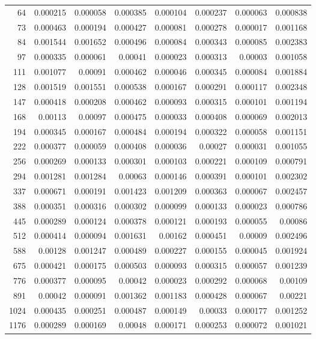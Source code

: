 \begin{longtable}{r r r r r r r r}
64 & 0.000215 & 0.000058 & 0.000385 & 0.000104 & 0.000237 & 0.000063 & 0.000838 \\
73 & 0.000463 & 0.000194 & 0.000427 & 0.000081 & 0.000278 & 0.000017 & 0.001168 \\
84 & 0.001544 & 0.001652 & 0.000496 & 0.000084 & 0.000343 & 0.000085 & 0.002383 \\
97 & 0.000335 & 0.000061 & 0.00041 & 0.000023 & 0.000313 & 0.00003 & 0.001058 \\
111 & 0.001077 & 0.00091 & 0.000462 & 0.000046 & 0.000345 & 0.000084 & 0.001884 \\
128 & 0.001519 & 0.001551 & 0.000538 & 0.000167 & 0.000291 & 0.000117 & 0.002348 \\
147 & 0.000418 & 0.000208 & 0.000462 & 0.000093 & 0.000315 & 0.000101 & 0.001194 \\
168 & 0.00113 & 0.00097 & 0.000475 & 0.000033 & 0.000408 & 0.000069 & 0.002013 \\
194 & 0.000345 & 0.000167 & 0.000484 & 0.000194 & 0.000322 & 0.000058 & 0.001151 \\
222 & 0.000377 & 0.000059 & 0.000408 & 0.000036 & 0.00027 & 0.000031 & 0.001055 \\
256 & 0.000269 & 0.000133 & 0.000301 & 0.000103 & 0.000221 & 0.000109 & 0.000791 \\
294 & 0.001281 & 0.001284 & 0.00063 & 0.000146 & 0.000391 & 0.000101 & 0.002302 \\
337 & 0.000671 & 0.000191 & 0.001423 & 0.001209 & 0.000363 & 0.000067 & 0.002457 \\
388 & 0.000351 & 0.000316 & 0.000302 & 0.000099 & 0.000133 & 0.000023 & 0.000786 \\
445 & 0.000289 & 0.000124 & 0.000378 & 0.000121 & 0.000193 & 0.000055 & 0.00086 \\
512 & 0.000414 & 0.000094 & 0.001631 & 0.00162 & 0.000451 & 0.00009 & 0.002496 \\
588 & 0.00128 & 0.001247 & 0.000489 & 0.000227 & 0.000155 & 0.000045 & 0.001924 \\
675 & 0.000421 & 0.000175 & 0.000503 & 0.000093 & 0.000315 & 0.000057 & 0.001239 \\
776 & 0.000377 & 0.000095 & 0.00042 & 0.000023 & 0.000292 & 0.000068 & 0.00109 \\
891 & 0.00042 & 0.000091 & 0.001362 & 0.001183 & 0.000428 & 0.000067 & 0.00221 \\
1024 & 0.000435 & 0.000251 & 0.000487 & 0.000149 & 0.00033 & 0.000177 & 0.001252 \\
1176 & 0.000289 & 0.000169 & 0.00048 & 0.000171 & 0.000253 & 0.000072 & 0.001021 \\

\end{longtable}
